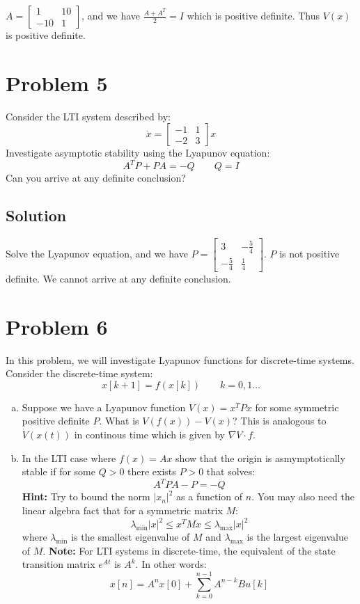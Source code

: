 \documentclass[11pt]{report}
\theoremstyle{definition}
\newcommand{\xlr}[2]{#1 \left(#2\right)}
\newcommand{\clr}[2]{#1 \left[#2 \right]}
\begin{document}
$A = \begin{bmatrix}1 &10\\ -10 & 1\end{bmatrix}$, and we have $\frac{A + A^T}{2} = I$ which is positive definite. Thus $V(x)$ is positive definite.
\section*{Problem 5}
Consider the LTI system described by:
$$
\dot x = \begin{bmatrix} -1 &1 \\ -2 &3  \end{bmatrix} x
$$
Investigate asymptotic stability using the Lyapunov equation:
$$
A ^T P + PA = -Q \qquad Q = I
$$
Can you arrive at any definite conclusion?

\subsection*{Solution}
Solve the Lyapunov equation, and we have $P = \begin{bmatrix} 3 &-\frac{5}{4}\\ -\frac{5}{4} &\frac{1}{4} \end{bmatrix}$. $P$ is not positive definite. We cannot arrive at any definite conclusion.

\section*{Problem 6}
In this problem, we will investigate Lyapunov functions for discrete-time systems. Consider the discrete-time system:
$$
\clr{x}{k+1} = \xlr{f}{\clr{x}{k}} \qquad k = 0, 1 \dots
$$
\begin{enumerate}[(a), noitemsep]
\item Suppose we have a Lyapunov function $\xlr{V}{x} = x^T P x$ for some symmetric positive definite $P$. What is $\xlr{V}{\xlr{f}{x}} - \xlr{V}{x}$? This is analogous to $ \xlr{\dot V}{\xlr{x}{t}}$ in continous time which is given by $\nabla V \cdot f$.
\item In the LTI case where $\xlr{f}{x} = A x$ show that the origin is asmymptotically stable if for some $Q >0$ there exists $P >0$ that solves:
$$A^TPA - P = -Q$$
\justify
\textbf{Hint:} Try to bound the norm $| x_n |^2$ as a function of $n$. You may also need the linear algebra fact that for a symmetric matrix $M$:
$$
\lambda_{\textrm{min}} |x|^2 \le x^T M x \le \lambda_{\textrm{max}} |x|^2
$$
where $\lambda_{\textrm{min}}$ is the smallest eigenvalue of $M$ and $\lambda_{\textrm{max}}$ is the largest eigenvalue of $M$.
\textbf{Note:} For LTI systems in discrete-time, the equivalent of the state transition matrix $e^{At}$ is $A^k$. In other words:
$$
\clr{x}{n} = A^n \clr{x}{0} + \sum\limits_{k = 0}^{n - 1} {{A^{n - k}}Bu\left[ k \right]}
$$
\end{enumerate}
\end{document}

